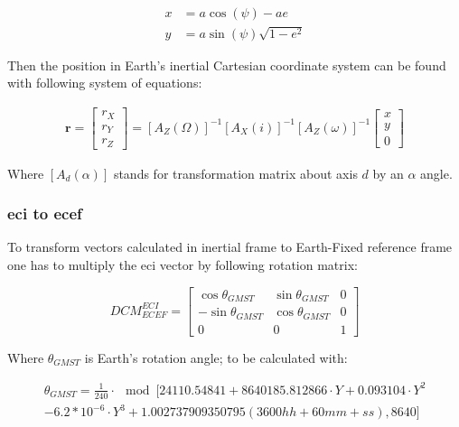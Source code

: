         \begin{align}
            x & = a\cos(\psi) -ae \\
            y &= a\sin(\psi)\sqrt{1-e^2}
        \end{align}

        Then the position in Earth's inertial Cartesian coordinate system can be found with following system of equations:

        \begin{align}
            \textbf{r} = \begin{bmatrix} r_X\\ r_Y\\ r_Z \end{bmatrix} = [A_Z(\Omega)]^{-1} [A_X(i)]^{-1} [A_Z(\omega)]^{-1} \begin{bmatrix} x\\ y\\ 0 \end{bmatrix}
        \end{align}

        Where $[A_d(\alpha)]$ stands for transformation matrix about axis $d$ by an $\alpha$ angle.

    \subsubsection{\ac{eci} to \ac{ecef}}
        To transform vectors calculated in inertial frame to Earth-Fixed reference frame one has to multiply the \ac{eci} vector by following rotation matrix:

        \begin{equation}
            DCM^{ECI}_{ECEF} = \begin{bmatrix} \cos\theta_{GMST} & \sin\theta_{GMST} & 0\\
            -\sin\theta_{GMST} & \cos\theta_{GMST} & 0 \\
            0 & 0 & 1 \end{bmatrix}
        \end{equation}

        Where $\theta_{GMST}$ is Earth's rotation angle; to be calculated with:

        \begin{multline}
        \theta_{GMST}= \frac{1}{240} \cdot \mod[24110.54841 + 8640185.812866 \cdot Y + 0.093104 \cdot Y^2 \\
            - 6.2*10^{-6} \cdot Y^3 + 1.002737909350795\left(3600hh+60mm+ss\right), 8640]
        \end{multline}


